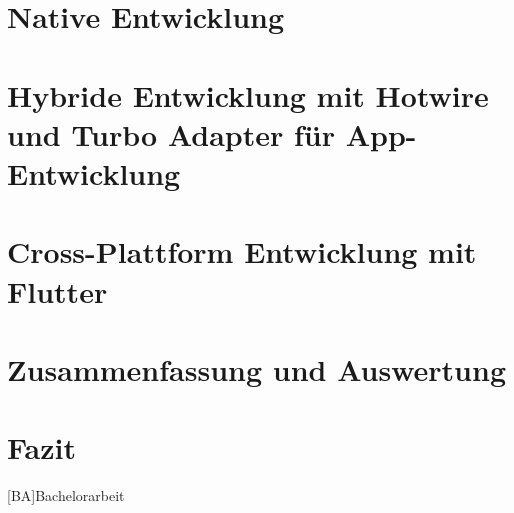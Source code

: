 \documentclass[12pt,a4paper,twosided,open=right]{scrbook}
\begin{document}


\mainmatter




\chapter{Native Entwicklung}

\chapter{Hybride Entwicklung mit Hotwire und Turbo Adapter für App-Entwicklung}

\chapter{Cross-Plattform Entwicklung mit Flutter}

\chapter{Zusammenfassung und Auswertung}
\chapter{Fazit}


\vfill
\pagebreak

\appendix

{}
\begin{acronym}[KDE]
[BA]{Bachelorarbeit}
\end{acronym}
\vfill
\pagebreak



  
\end{document}
